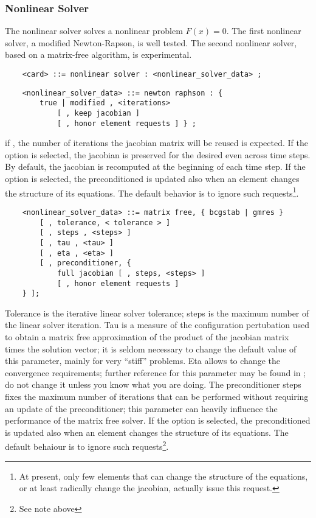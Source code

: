 \subsubsection{Nonlinear Solver}
The nonlinear solver solves a nonlinear problem $F(x)=0$.
The first nonlinear solver, a modified Newton-Rapson, 
is well tested. The second nonlinear solver, based on a
matrix-free algorithm, is experimental.
\begin{verbatim}
    <card> ::= nonlinear solver : <nonlinear_solver_data> ;
\end{verbatim}
\begin{verbatim}
    <nonlinear_solver_data> ::= newton raphson : { 
        true | modified , <iterations>
            [ , keep jacobian ]
            [ , honor element requests ] } ;
\end{verbatim}
if , the number of iterations the jacobian matrix will be
reused is expected.
If the option  is selected, the jacobian is preserved
for the desired  even across time steps.
By default, the jacobian is recomputed at the beginning of each time step.
If the option  is selected, the preconditioned
is updated also when an element changes the structure of its equations.
The default behavior is to ignore such requests\footnote{
	At present, only few elements that can change the structure
	of the equations, or at least radically change the jacobian,
	actually issue this request.
}.
\begin{verbatim}
    <nonlinear_solver_data> ::= matrix free, { bcgstab | gmres }
        [ , tolerance, < tolerance > ]
        [ , steps , <steps> ]
        [ , tau , <tau> ]
        [ , eta , <eta> ]
        [ , preconditioner, {
            full jacobian [ , steps, <steps> ] 
	        [ , honor element requests ]
    } ];
\end{verbatim}
Tolerance is the iterative linear solver tolerance;
steps is the maximum number of the linear solver iteration.
Tau is a measure of the configuration pertubation used
to obtain a matrix free approximation of the product
of the jacobian matrix times the solution vector;
it is seldom necessary to change the default value of this parameter,
mainly for very ``stiff'' problems.
Eta allows to change the convergence requirements; further reference for
this parameter may be found in \cite{KELLEY-1995}; do not change it
unless you know what you are doing.
The preconditioner steps fixes the maximum number of
iterations that can be performed without requiring
an update of the preconditioner; this parameter can heavily influence
the performance of the matrix free solver.
If the option  is selected, the preconditioned
is updated also when an element changes the structure of its equations.
The default behaiour is to ignore such requests\footnote{See note above}.


